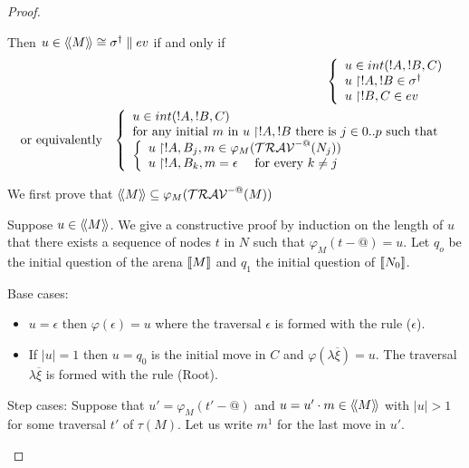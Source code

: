 \begin{proof}
\begin{itemize}
    Then $u \in {\langle\!\langle M \rangle\!\rangle} \cong \sigma^{\dag} \parallel ev$ if and only if
    \begin{eqnarray*}
      &&      \left\{
            \begin{array}{ll}
                u \in int(!A,!B,C)\\
                u \upharpoonright !A,!B  \in \sigma^\dagger \\
                u \upharpoonright !B,C  \in  ev
            \end{array}
            \right. \\
    & \mbox{or equivalently} & \left\{
    \begin{array}{ll}
        u \in int(!A,!B,C) \\
        \hbox{for any initial $m$ in $u \upharpoonright !A,!B$ there is $j \in 0..p$ such that } \\
        \left\{\begin{array}{ll}
            u \upharpoonright !A,B_j, m \in \varphi_{M} (\travset^{-@}(N_j)) \label{eq:def_z} \\ %
            u \upharpoonright !A, B_k,m = \epsilon \quad \mbox{ for every } k\neq j \label{eq:b}
        \end{array}
        \right.
    \end{array}
    \right.
    \end{eqnarray*}


    We first prove that ${\langle\!\langle M \rangle\!\rangle} \subseteq \varphi_{M}( \mathcal{TRAV}^{-@}(M) )$


    Suppose $u \in {\langle\!\langle M \rangle\!\rangle}$. We give a constructive proof by induction on the length of $u$ that
    there exists a sequence of nodes $t$ in $N$ such that $\varphi_M(t-@) = u$.
    Let $q_o$ be the initial question of the arena ${[\![ M ]\!]}$ and $q_1$ the initial question of ${[\![ N_0 ]\!]}$.

    Base cases:
    \begin{itemize}
    \item $u=\epsilon$ then $\varphi(\epsilon) = u$ where the traversal $\epsilon$ is formed with the rule ($\epsilon$).
    \item If $|u|=1$ then $u=q_0$ is the initial move in $C$ and $\varphi(\lambda \overline{\xi}) = u$. The traversal
    $\lambda \overline{\xi}$ is formed with the rule (Root).
    \end{itemize}

    Step cases: Suppose that $u' = \varphi_M(t'-@)$ and $u = u' \cdot m \in {\langle\!\langle M \rangle\!\rangle}$ with $|u|>1$ for some traversal $t'$ of $\tau(M)$.
    Let us write $m^1$ for the last move in $u'$.


\end{itemize}
\end{proof}
